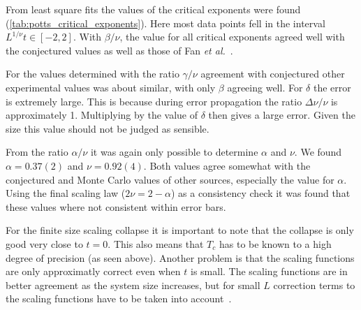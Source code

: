 \documentclass[11pt, a4paper]{report} %
\begin{document}
From least square fits the values of the critical exponents were found (\cref{tab:potts_critical_exponents}).
Here most data points fell in the interval \(L^{1/\nu}t \in [-2, 2]\).
With \(\beta/\nu\), the value for all critical exponents agreed well with the conjectured values as well as those of Fan \textit{et al.}~\cite{fan:2007}.


For the values determined with the ratio \(\gamma / \nu\) agreement with conjectured other experimental values was about similar, with only \(\beta\) agreeing well.
For \(\delta\) the error is extremely large. This is because during error propagation the ratio \(\Delta \nu / \nu\) is approximately 1.
Multiplying by the value of \(\delta\) then gives a large error.
Given the size this value should not be judged as sensible.

From the ratio \(\alpha/\nu\) it was again only possible to determine \(\alpha\) and \(\nu\).
We found \(\alpha = 0.37(2)\) and \(\nu = 0.92(4)\).
Both values agree somewhat with the conjectured and Monte Carlo values of other sources, especially the value for \(\alpha\).
Using the final scaling law (\(2\nu = 2 -\alpha\)) as a consistency check it was found that these values where not consistent within error bars.

\vspace*{\baselineskip}

For the finite size scaling collapse it is important to note that the collapse is only good very close to \(t=0\).
This also means that \(T_c\) has to be known to a high degree of precision (as seen above).
Another problem is that the scaling functions are only approximatly correct even when \(t\) is small.
The scaling functions are in better agreement as the system size increases, but for small \(L\) correction terms to the scaling functions have to be taken into account~\cite{newman:1999}.
\end{document}

